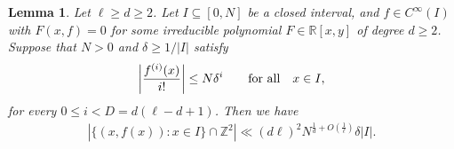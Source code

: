 \documentclass[12pt]{amsart}
\newcommand{\C}{{\mathbb C}}
\newcommand{\R}{{\mathbb R}}
\newcommand{\Z}{{\mathbb Z}}
\newcommand{\1}{{\mathbf 1}}
\newtheorem{lemma}[theorem]{Lemma}
\newtheorem{corollary}[theorem]{Corollary}
\theoremstyle{remark}
\theoremstyle{definition}
\begin{document}

\begin{lemma}\label{lem-intbound1}
Let $\ell \geq d\geq 2$. Let $I\subseteq [0,N]$ be a closed interval, and $f\in C^{\infty}(I)$ with $F(x,f)=0$ for some irreducible polynomial $F\in \R[x,y]$ of degree $d\geq 2$. Suppose that $N>0$ and $\delta\geq 1/\lvert I\rvert$ satisfy
\[\left\lvert \frac{f^{(i)}(x)}{i!}\right\rvert\leq N\delta^i\qquad {\rm for \ all }\quad x\in I,\]
for every $0\leq i<D=d(\ell-d+1)$. Then we have
\begin{align*}
\left\lvert\big\{(x,f(x)) : x\in I\big\}\cap \Z^2\right\rvert \ll(d\ell)^2 N^{\frac{1}{d}+O(\frac{1}{\ell})} \delta\lvert I\rvert.
\end{align*}
\end{lemma}
\end{document}

